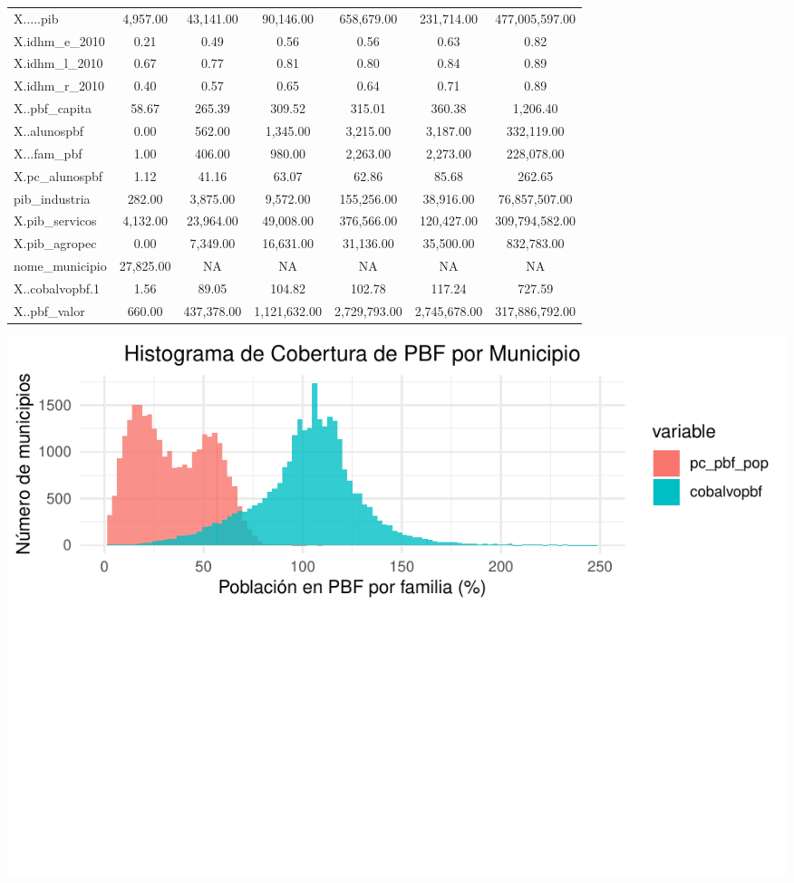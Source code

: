 \documentclass[
]{article}
\begin{document}
\begin{table}[!h]
\begin{tabular}[t]{lcccccc}
\addlinespace
X.....pib & 4,957.00 & 43,141.00 & 90,146.00 & 658,679.00 & 231,714.00 & 477,005,597.00\\
X.idhm\_e\_2010 & 0.21 & 0.49 & 0.56 & 0.56 & 0.63 & 0.82\\
X.idhm\_l\_2010 & 0.67 & 0.77 & 0.81 & 0.80 & 0.84 & 0.89\\
X.idhm\_r\_2010 & 0.40 & 0.57 & 0.65 & 0.64 & 0.71 & 0.89\\
X..pbf\_capita & 58.67 & 265.39 & 309.52 & 315.01 & 360.38 & 1,206.40\\
\addlinespace
X..alunospbf & 0.00 & 562.00 & 1,345.00 & 3,215.00 & 3,187.00 & 332,119.00\\
X...fam\_pbf & 1.00 & 406.00 & 980.00 & 2,263.00 & 2,273.00 & 228,078.00\\
X.pc\_alunospbf & 1.12 & 41.16 & 63.07 & 62.86 & 85.68 & 262.65\\
pib\_industria & 282.00 & 3,875.00 & 9,572.00 & 155,256.00 & 38,916.00 & 76,857,507.00\\
X.pib\_servicos & 4,132.00 & 23,964.00 & 49,008.00 & 376,566.00 & 120,427.00 & 309,794,582.00\\
\addlinespace
X.pib\_agropec & 0.00 & 7,349.00 & 16,631.00 & 31,136.00 & 35,500.00 & 832,783.00\\
nome\_municipio & 27,825.00 & NA & NA & NA & NA & NA\\
X..cobalvopbf.1 & 1.56 & 89.05 & 104.82 & 102.78 & 117.24 & 727.59\\
X..pbf\_valor & 660.00 & 437,378.00 & 1,121,632.00 & 2,729,793.00 & 2,745,678.00 & 317,886,792.00\\
\bottomrule
\end{tabular}
\end{table}
\newpage

\includegraphics{PBF_files/figure-latex/unnamed-chunk-4-1.pdf}
\end{document}
